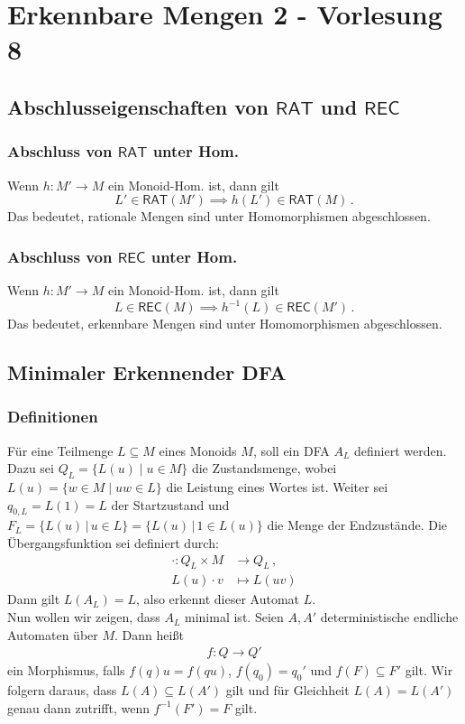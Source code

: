 \documentclass[12pt, german]{article}
\newcommand{\inv}{^{-1}}
\newcommand{\rat}{\mathsf{RAT}}
\newcommand{\rec}{\mathsf{REC}}
\begin{document}
	\section{Erkennbare Mengen 2 - Vorlesung 8}
	\subsection{Abschlusseigenschaften von $\rat$ und $\rec$}
	\subsubsection{Abschluss von $\rat$ unter Hom.}
	Wenn $h: M' \to M$ ein Monoid-Hom. ist, dann gilt $$L' \in \rat(M') \implies h(L') \in \rat(M)\, .$$
	Das bedeutet, rationale Mengen sind unter Homomorphismen abgeschlossen.
	
	\subsubsection{Abschluss von $\rec$ unter Hom.}
	Wenn $h: M' \to M$ ein Monoid-Hom. ist, dann gilt $$L \in \rec(M) \implies h\inv(L) \in \rec(M')\, .$$
	Das bedeutet, erkennbare Mengen sind unter Homomorphismen abgeschlossen.
	
	\subsection{Minimaler Erkennender DFA}
	\subsubsection{Definitionen}
	\label{sec:min_dfa}
	Für eine Teilmenge $L \subseteq M$ eines Monoids $M$, soll ein DFA $A_L$ definiert werden.
	Dazu sei $Q_L = \{L(u) \mid u \in M\}$ die Zustandsmenge, wobei $L(u) = \{ w \in M \mid uw \in L\}$ die Leistung eines Wortes ist. Weiter sei $q_{0,L}=L(1)=L$ der Startzustand und $F_L=\{L(u) \, | \, u \in L\}= \{L(u) \, | \, 1 \in L(u)\}$ die Menge der Endzustände.
	Die Übergangsfunktion sei definiert durch:
	\begin{align*}
		\cdot: Q_L \times M  &\to Q_L\, ,\\
		L(u)\cdot v &\mapsto L(uv)
	\end{align*}
	Dann gilt $L(A_L) = L$, also erkennt dieser Automat $L$.\\
	Nun wollen wir zeigen, dass $A_L$ minimal ist.
	Seien $A, A'$ deterministische endliche Automaten über $M$. Dann heißt 
	\begin{align*}
		f: Q \to Q'
	\end{align*} ein Morphismus, falls $f(q)u=f(qu)$, $f(q_0) = q_0'$ und $f(F) \subseteq F'$ gilt.
	Wir folgern daraus, dass $L(A) \subseteq L(A')$ gilt und für Gleichheit $L(A) = L(A')$ genau dann zutrifft, wenn $f\inv(F') = F$ gilt. 
	
\end{document}
